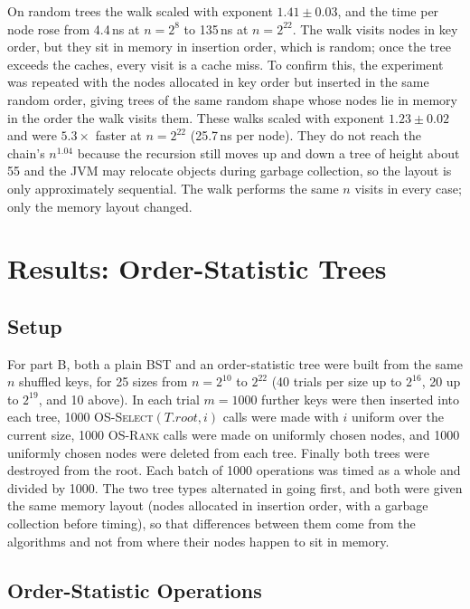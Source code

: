 \documentclass[conference]{IEEEtran}
\newcommand{\SEL}{\textsc{OS-Select}}
\newcommand{\RANK}{\textsc{OS-Rank}}
\begin{document}
On random trees the walk scaled with exponent $1.41 \pm 0.03$, and the time
per node rose from 4.4\,ns at $n = 2^8$ to 135\,ns at $n = 2^{22}$. The walk
visits nodes in key order, but they sit in memory in insertion order, which
is random; once the tree exceeds the caches, every visit is a cache miss.
To confirm this, the experiment was repeated with the nodes allocated in key
order but inserted in the same random order, giving trees of the same random
shape whose nodes lie in memory in the order the walk visits them. These
walks scaled with exponent $1.23 \pm 0.02$ and were $5.3\times$ faster at
$n = 2^{22}$ (25.7\,ns per node). They do not reach the chain's $n^{1.04}$
because the recursion still moves up and down a tree of height about 55 and
the JVM may relocate objects during garbage collection, so the layout is only
approximately sequential. The walk performs the same $n$ visits in every
case; only the memory layout changed.

\section{Results: Order-Statistic Trees}

\subsection{Setup}

For part B, both a plain BST and an order-statistic tree were built from the
same $n$ shuffled keys, for 25 sizes from $n = 2^{10}$ to $2^{22}$ (40 trials
per size up to $2^{16}$, 20 up to $2^{19}$, and 10 above). In each trial
$m = 1000$ further keys were then inserted into each tree, 1000
\SEL{}$(T.\mathit{root}, i)$ calls were made with $i$ uniform over the current
size, 1000 \RANK{} calls were made on uniformly chosen nodes, and 1000
uniformly chosen nodes were deleted from each tree. Finally both trees were
destroyed from the root. Each batch of 1000 operations was timed as a whole
and divided by 1000. The two tree types alternated in going first, and both
were given the same memory layout (nodes allocated in insertion order, with a
garbage collection before timing), so that differences between them come from
the algorithms and not from where their nodes happen to sit in memory.

\subsection{Order-Statistic Operations}
\end{document}
